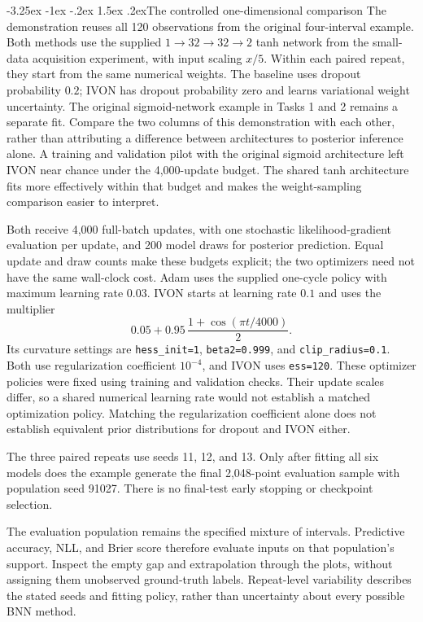 \documentclass[11pt,a4paper]{article}
\makeatletter
\renewcommand\subsection{\@startsection{subsection}{2}{\z@}%
  {-3.25ex \@plus -1ex \@minus -.2ex}%
  {1.5ex \@plus .2ex}{\normalfont\large}}
\makeatother
\begin{document}
\subsection{The controlled one-dimensional comparison}
The demonstration reuses all 120 observations from the original four-interval
example. Both methods use the supplied $1\to32\to32\to2$ tanh network from
the small-data acquisition experiment, with input scaling $x/5$.
Within each paired repeat, they start from the same numerical weights.
The baseline uses dropout probability $0.2$; IVON has dropout probability
zero and learns variational weight uncertainty. The original sigmoid-network
example in Tasks 1 and 2 remains a separate fit. Compare the two columns of
this demonstration with each other, rather than attributing a difference
between architectures to posterior inference alone.
A training and validation pilot with the original sigmoid architecture left
IVON near chance under the 4,000-update budget. The shared tanh architecture
fits more effectively within that budget and makes the weight-sampling
comparison easier to interpret.

Both receive 4,000 full-batch updates, with one stochastic likelihood-gradient
evaluation per update, and 200 model draws for posterior prediction. Equal
update and draw counts make these budgets explicit; the two optimizers need
not have the same wall-clock cost. Adam uses the supplied one-cycle policy
with maximum learning rate $0.03$. IVON starts at learning rate $0.1$ and
uses the multiplier
\[
 0.05+0.95\,\frac{1+\cos(\pi t/4000)}{2}.
\]
Its curvature settings are \texttt{hess\_init=1}, \texttt{beta2=0.999},
and \texttt{clip\_radius=0.1}. Both use regularization coefficient
$10^{-4}$, and IVON uses \texttt{ess=120}. These optimizer policies were
fixed using training and validation checks. Their update scales differ,
so a shared numerical learning rate would not establish a matched
optimization policy. Matching the regularization coefficient alone does
not establish equivalent prior distributions for dropout and IVON either.

The three paired repeats use seeds 11, 12, and 13. Only after fitting all
six models does the example generate the final 2,048-point evaluation sample
with population seed 91027. There is no final-test early stopping or
checkpoint selection.

The evaluation population remains the specified mixture of intervals.
Predictive accuracy, NLL, and Brier score therefore evaluate inputs on that
population's support. Inspect the empty
gap and extrapolation through the plots, without assigning them unobserved
ground-truth labels. Repeat-level variability describes the stated seeds and
fitting policy, rather than uncertainty about every possible BNN method.
\end{document}
